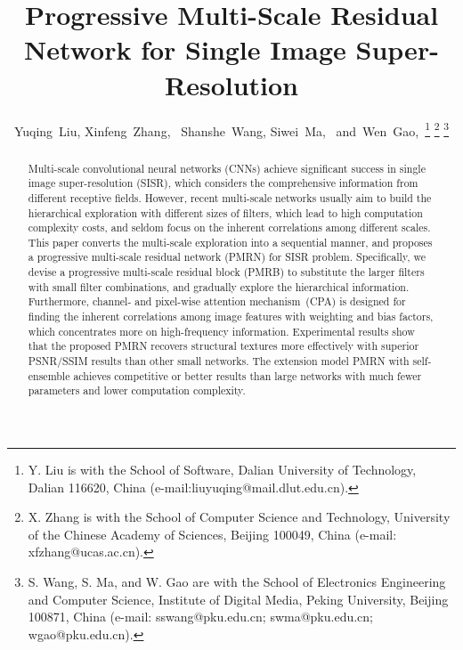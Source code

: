 \documentclass[journal]{IEEEtran}
\begin{document}
	\title{Progressive Multi-Scale Residual Network for Single Image Super-Resolution}
	\author{
		Yuqing~Liu,
		Xinfeng~Zhang,~
		Shanshe~Wang,
		Siwei~Ma,~
		and~Wen~Gao,~\thanks{Y. Liu is with the School of Software, Dalian University of Technology, 
			Dalian 116620, China (e-mail:liuyuqing@mail.dlut.edu.cn).}
		\thanks{X. Zhang is with the School of Computer Science and Technology, University of the Chinese Academy of Sciences, Beijing 100049, China (e-mail:
			xfzhang@ucas.ac.cn).}
		\thanks{S. Wang, S. Ma, and W. Gao are with the School of Electronics Engineering and Computer Science, Institute of Digital Media, Peking University, Beijing 100871, China (e-mail: sswang@pku.edu.cn; swma@pku.edu.cn; wgao@pku.edu.cn).}
	}

	
	

	\maketitle
	
	
\begin{abstract}
Multi-scale convolutional neural networks (CNNs) achieve significant success in single image super-resolution (SISR), which considers the comprehensive information from different receptive fields.
However, recent multi-scale networks usually aim to build the hierarchical exploration with different sizes of filters, which lead to high computation complexity costs, and seldom focus on the inherent correlations among different scales.
This paper converts the multi-scale exploration into a sequential manner, and proposes a progressive multi-scale residual network (PMRN) for SISR problem. 
Specifically, we devise a progressive multi-scale residual block (PMRB) to substitute the larger filters with small filter combinations, and gradually explore the hierarchical information.
Furthermore, channel- and pixel-wise attention mechanism~(CPA) is designed for finding the inherent correlations among image features with weighting and bias factors, which concentrates more on high-frequency information.
Experimental results show that the proposed PMRN recovers structural textures more effectively with superior PSNR/SSIM results than other small networks. The extension model PMRN with self-ensemble achieves competitive or better results than large networks with much fewer parameters and lower computation complexity.
 


\end{abstract}
\end{document}
